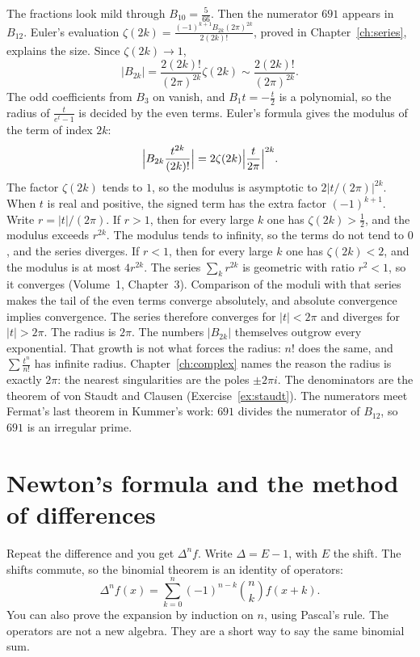 \begin{remark}
The fractions look mild through $B_{10}=\frac5{66}$. Then the numerator $691$ appears in $B_{12}$. Euler's evaluation $\zeta(2k)=\frac{(-1)^{k+1}B_{2k}(2\pi)^{2k}}{2(2k)!}$, proved in Chapter~\ref{ch:series}, explains the size. Since $\zeta(2k)\to1$,
\[
|B_{2k}|=\frac{2(2k)!}{(2\pi)^{2k}}\zeta(2k)\sim\frac{2(2k)!}{(2\pi)^{2k}}.
\]
The odd coefficients from $B_3$ on vanish, and $B_1t=-\frac t2$ is a polynomial, so the radius of $\frac t{e^t-1}$ is decided by the even terms. Euler's formula gives the modulus of the term of index $2k$:
\[
\Bigl|B_{2k}\frac{t^{2k}}{(2k)!}\Bigr|=2\zeta(2k)\Bigl|\frac{t}{2\pi}\Bigr|^{2k}.
\]
The factor $\zeta(2k)$ tends to $1$, so the modulus is asymptotic to $2\bigl|t/(2\pi)\bigr|^{2k}$. When $t$ is real and positive, the signed term has the extra factor $(-1)^{k+1}$. Write $r=|t|/(2\pi)$. If $r>1$, then for every large $k$ one has $\zeta(2k)>\frac12$, and the modulus exceeds $r^{2k}$. The modulus tends to infinity, so the terms do not tend to $0$, and the series diverges. If $r<1$, then for every large $k$ one has $\zeta(2k)<2$, and the modulus is at most $4r^{2k}$. The series $\sum_k r^{2k}$ is geometric with ratio $r^2<1$, so it converges (Volume~1, Chapter~3). Comparison of the moduli with that series makes the tail of the even terms converge absolutely, and absolute convergence implies convergence. The series therefore converges for $|t|<2\pi$ and diverges for $|t|>2\pi$. The radius is $2\pi$. The numbers $|B_{2k}|$ themselves outgrow every exponential. That growth is not what forces the radius: $n!$ does the same, and $\sum\frac{t^n}{n!}$ has infinite radius. Chapter~\ref{ch:complex} names the reason the radius is exactly $2\pi$: the nearest singularities are the poles $\pm2\pi i$. The denominators are the theorem of von Staudt and Clausen (Exercise~\ref{ex:staudt}). The numerators meet Fermat's last theorem in Kummer's work: $691$ divides the numerator of $B_{12}$, so $691$ is an irregular prime.
\end{remark}

\section{Newton's formula and the method of differences}

Repeat the difference and you get $\Delta^nf$. Write $\Delta=E-1$, with $E$ the shift. The shifts commute, so the binomial theorem is an identity of operators:
\[
\Delta^nf(x)=\sum_{k=0}^n(-1)^{n-k}\binom nkf(x+k).
\]
You can also prove the expansion by induction on $n$, using Pascal's rule. The operators are not a new algebra. They are a short way to say the same binomial sum.

